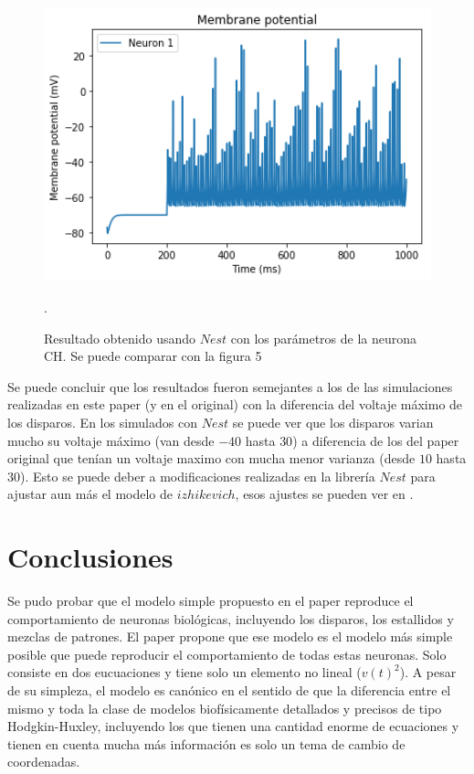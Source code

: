 \documentclass[12pt]{article}
\begin{document}
\begin{figure}[h!]
    \centering
        \includegraphics[height=8cm]{images/CH_nest.png}
    \caption[fontsize=2pt]{Resultado obtenido usando $Nest$ con los parámetros de la neurona CH. Se puede comparar con la figura 5}.
\end{figure}

\newpage

Se puede concluir que los resultados fueron semejantes a los de las simulaciones realizadas en este paper (y en el original) con la diferencia del voltaje máximo de los disparos.
En los simulados con $Nest$ se puede ver que los disparos varian mucho su voltaje máximo (van desde $-40$ hasta $30$) a diferencia de los del paper original que tenían un voltaje maximo con mucha menor varianza (desde $10$ hasta $30$).
Esto se puede deber a modificaciones realizadas en la librería $Nest$ para ajustar aun más el modelo de $izhikevich$, esos ajustes se pueden ver en \cite{nest_izhikevich}.

\newpage

\section{Conclusiones}

Se pudo probar que el modelo simple propuesto en el paper reproduce el comportamiento de neuronas biológicas, incluyendo los disparos, los estallidos y mezclas de patrones. El paper propone que ese modelo es el modelo más simple posible que puede reproducir el comportamiento de todas estas neuronas.
Solo consiste en dos eucuaciones y tiene solo un elemento no lineal ($v(t)^2$).
A pesar de su simpleza, el modelo es canónico en el sentido de que la diferencia entre el mismo y toda la clase de modelos biofísicamente detallados y precisos de tipo Hodgkin-Huxley, incluyendo los que tienen una cantidad enorme de ecuaciones y tienen en cuenta mucha más información es solo un tema de cambio de coordenadas. \\
\end{document}
